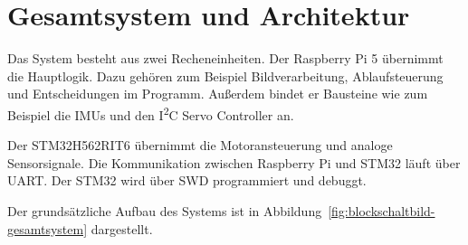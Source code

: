 \newpage
\section{Gesamtsystem und Architektur}
Das System besteht aus zwei Recheneinheiten. Der Raspberry Pi 5 übernimmt die Hauptlogik. Dazu gehören zum Beispiel Bildverarbeitung, Ablaufsteuerung und Entscheidungen im Programm. Außerdem bindet er Bausteine wie zum Beispiel die IMUs und den I\textsuperscript{2}C Servo Controller an.

Der STM32H562RIT6 übernimmt die Motoransteuerung und analoge Sensorsignale. Die Kommunikation zwischen Raspberry Pi und STM32 läuft über UART.
Der STM32 wird über SWD programmiert und debuggt. 

Der grundsätzliche Aufbau des Systems ist in Abbildung~\ref{fig:blockschaltbild-gesamtsystem} dargestellt.

